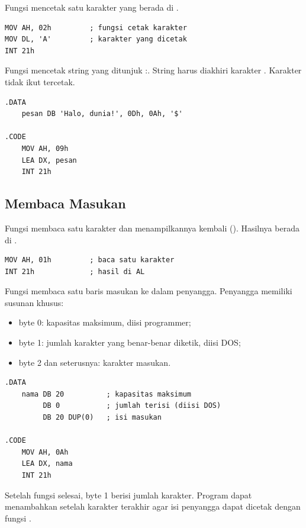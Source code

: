 Fungsi  mencetak satu karakter yang berada di .

\begin{lstlisting}[language=MASM, numbers=none]
MOV AH, 02h         ; fungsi cetak karakter
MOV DL, 'A'         ; karakter yang dicetak
INT 21h
\end{lstlisting}

Fungsi  mencetak string yang ditunjuk :.
String harus diakhiri karakter . Karakter 
tidak ikut tercetak.

\begin{lstlisting}[language=MASM, numbers=none]
.DATA
    pesan DB 'Halo, dunia!', 0Dh, 0Ah, '$'

.CODE
    MOV AH, 09h
    LEA DX, pesan
    INT 21h
\end{lstlisting}

\subsection{Membaca Masukan}

Fungsi  membaca satu karakter dan menampilkannya kembali
(). Hasilnya berada di .

\begin{lstlisting}[language=MASM, numbers=none]
MOV AH, 01h         ; baca satu karakter
INT 21h             ; hasil di AL
\end{lstlisting}

Fungsi  membaca satu baris masukan ke dalam penyangga.
Penyangga memiliki susunan khusus:

\begin{itemize}
    \item byte 0: kapasitas maksimum, diisi programmer;
    \item byte 1: jumlah karakter yang benar-benar diketik, diisi
          DOS;
    \item byte 2 dan seterusnya: karakter masukan.
\end{itemize}

\begin{lstlisting}[language=MASM, numbers=none]
.DATA
    nama DB 20          ; kapasitas maksimum
         DB 0           ; jumlah terisi (diisi DOS)
         DB 20 DUP(0)   ; isi masukan

.CODE
    MOV AH, 0Ah
    LEA DX, nama
    INT 21h
\end{lstlisting}

Setelah fungsi  selesai, byte 1 berisi jumlah karakter.
Program dapat menambahkan  setelah karakter terakhir agar
isi penyangga dapat dicetak dengan fungsi .


